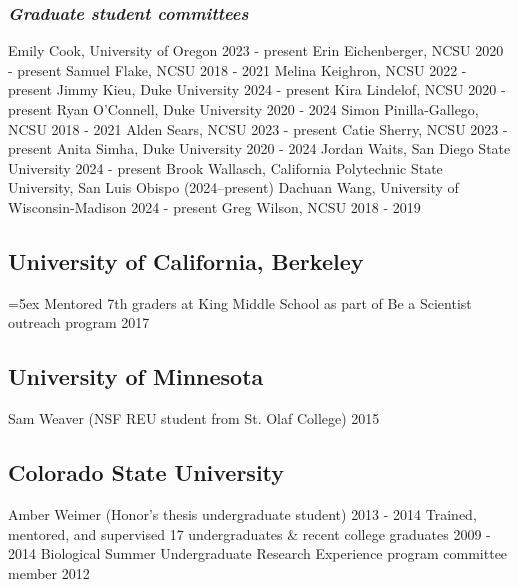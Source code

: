\documentclass[11pt,english]{article}\usepackage[]{graphicx}\usepackage[]{xcolor}
\begin{document}
\subsubsection*{\emph{Graduate student committees}}
Emily Cook, University of Oregon \hfill {2023 - present} \newline
Erin Eichenberger, NCSU \hfill {2020 - present} \newline 
Samuel Flake, NCSU \hfill {2018 - 2021} \newline
Melina Keighron, NCSU \hfill {2022 - present} \newline
Jimmy Kieu, Duke University \hfill {2024 - present} \newline
Kira Lindelof, NCSU \hfill {2020 - present} \newline
Ryan O'Connell, Duke University \hfill {2020 - 2024} \newline
Simon Pinilla-Gallego, NCSU \hfill {2018 - 2021} \newline
Alden Sears, NCSU \hfill {2023 - present} \newline
Catie Sherry, NCSU \hfill {2023 - present} \newline
Anita Simha, Duke University \hfill {2020 - 2024} \newline
Jordan Waits, San Diego State University \hfill {2024 - present} \newline
Brook Wallasch, California Polytechnic State University, San Luis Obispo (2024–present) \newline
Dachuan Wang, University of Wisconsin-Madison \hfill {2024 - present} \newline
Greg Wilson, NCSU \hfill {2018 - 2019} 

\subsection*{University of California, Berkeley}
\hangindent=5ex Mentored 7th graders at King Middle School as part of Be a Scientist outreach program \hfill {2017} 

\subsection*{University of Minnesota}
Sam Weaver (NSF REU student from St. Olaf College)		 \hfill {2015} 

\subsection*{Colorado State University}
Amber Weimer (Honor's thesis undergraduate student)		 \hfill {2013 - 2014} \newline
Trained, mentored, and supervised 17 undergraduates \& recent college graduates		 \hfill {2009 - 2014} \newline
Biological Summer Undergraduate Research Experience program committee member \hfill {2012} 
\end{document}
